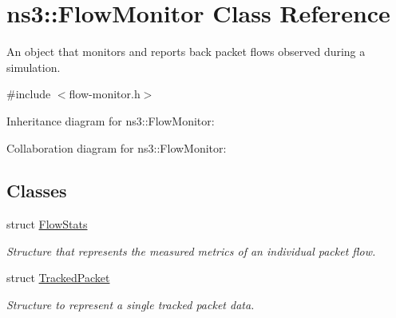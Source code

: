 \hypertarget{classns3_1_1FlowMonitor}{}\section{ns3\+:\+:Flow\+Monitor Class Reference}
\label{classns3_1_1FlowMonitor}


An object that monitors and reports back packet flows observed during a simulation.  




{\ttfamily \#include $<$flow-\/monitor.\+h$>$}



Inheritance diagram for ns3\+:\+:Flow\+Monitor\+:


Collaboration diagram for ns3\+:\+:Flow\+Monitor\+:
\subsection*{Classes}
\begin{DoxyCompactItemize}
\item 
struct \hyperlink{structns3_1_1FlowMonitor_1_1FlowStats}{Flow\+Stats}
\begin{DoxyCompactList}\small\item\em Structure that represents the measured metrics of an individual packet flow. \end{DoxyCompactList}\item 
struct \hyperlink{structns3_1_1FlowMonitor_1_1TrackedPacket}{Tracked\+Packet}
\begin{DoxyCompactList}\small\item\em Structure to represent a single tracked packet data. \end{DoxyCompactList}\end{DoxyCompactItemize}
